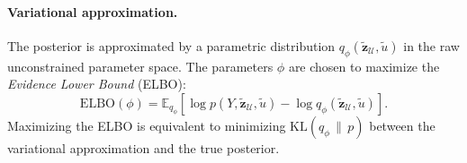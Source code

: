 \paragraph{Variational approximation.}
The posterior is approximated by a parametric distribution
$q_\phi(\widetilde{\bm z}_{\mathcal U},\widetilde u)$ in the raw unconstrained parameter space.
The parameters $\phi$ are chosen to maximize the \emph{Evidence Lower Bound} (ELBO):
\[
\mathrm{ELBO}(\phi)
=
\mathbb{E}_{q_\phi}
\left[
\log p(Y,\widetilde{\bm z}_{\mathcal U},\widetilde u)
-
\log q_\phi(\widetilde{\bm z}_{\mathcal U},\widetilde u)
\right].
\]
Maximizing the ELBO is equivalent to minimizing $\mathrm{KL}(q_\phi \,\|\, p)$ between the variational approximation and the true posterior.

